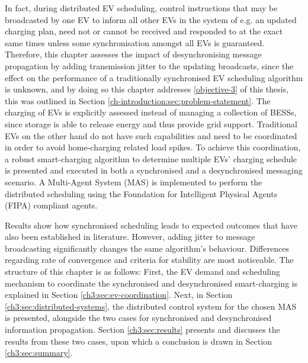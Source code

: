 In fact, during distributed EV scheduling, control instructions that may be broadcasted by one EV to inform all other EVs in the system of e.g. an updated charging plan, need not or cannot be received and responded to at the exact same times unless some synchronisation amongst all EVs is guaranteed.
Therefore, this chapter assesses the impact of desynchronising message propagation by adding transmission jitter to the updating broadcasts, since the effect on the performance of a traditionally synchronised EV scheduling algorithm is unknown, and by doing so this chapter addresses \ref{objective-3} of this thesis, this was outlined in Section \ref{ch-introduction:sec:problem-statement}.
The charging of EVs is explicitly assessed instead of managing a collection of BESSs, since storage is able to release energy and thus provide grid support.
Traditional EVs on the other hand do not have such capabilities and need to be coordinated in order to avoid home-charging related load spikes.
To achieve this coordination, a robust smart-charging algorithm to determine multiple EVs' charging schedule is presented and executed in both a synchronised and a desynchronised messaging scenario.
A Multi-Agent System (MAS) is implemented to perform the distributed scheduling using the Foundation for Intelligent Physical Agents (FIPA) compliant agents.

Results show how synchronised scheduling leads to expected outcomes that have also been established in literature.
However, adding jitter to message broadcasting significantly changes the same algorithm's behaviour.
Differences regarding rate of convergence and criteria for stability are most noticeable.
The structure of this chapter is as follows:
First, the EV demand and scheduling mechanism to coordinate the synchronised and desynchronised smart-charging is explained in Section \ref{ch3:sec:ev-coordination}.
Next, in Section \ref{ch3:sec:distributed-systems}, the distributed control system for the chosen MAS is presented, alongside the two cases for synchronised and desynchronised information propagation.
Section \ref{ch3:sec:results} presents and discusses the results from these two cases, upon which a conclusion is drawn in Section \ref{ch3:sec:summary}.
